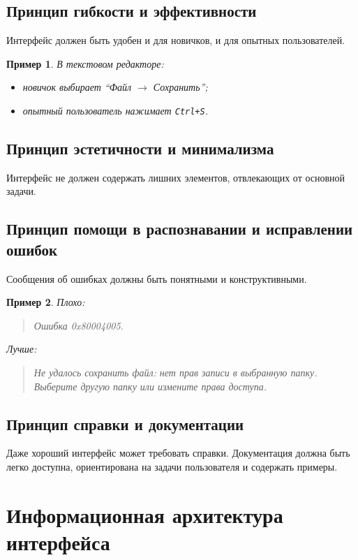\documentclass[12pt,a4paper]{article}
\newtheorem{example}{Пример}
\begin{document}
\subsection{Принцип гибкости и эффективности}

Интерфейс должен быть удобен и для новичков, и для опытных пользователей.

\begin{example}
В текстовом редакторе:
\begin{itemize}
    \item новичок выбирает ``Файл $\rightarrow$ Сохранить'';
    \item опытный пользователь нажимает \texttt{Ctrl+S}.
\end{itemize}
\end{example}

\subsection{Принцип эстетичности и минимализма}

Интерфейс не должен содержать лишних элементов, отвлекающих от основной задачи.

\subsection{Принцип помощи в распознавании и исправлении ошибок}

Сообщения об ошибках должны быть понятными и конструктивными.

\begin{example}
Плохо:
\begin{quote}
Ошибка 0x80004005.
\end{quote}

Лучше:
\begin{quote}
Не удалось сохранить файл: нет прав записи в выбранную папку. Выберите другую папку или измените права доступа.
\end{quote}
\end{example}

\subsection{Принцип справки и документации}

Даже хороший интерфейс может требовать справки. Документация должна быть легко доступна, ориентирована на задачи пользователя и содержать примеры.

\section{Информационная архитектура интерфейса}
\end{document}
